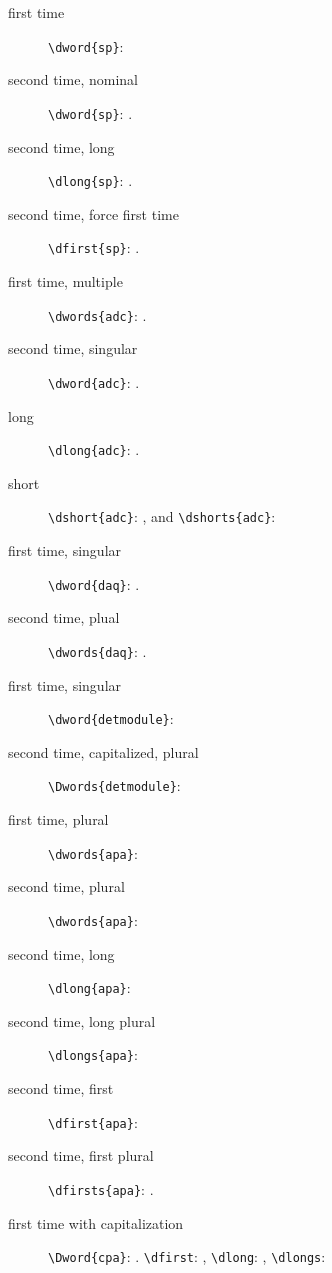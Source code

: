 \documentclass{article}
\begin{document}
\begin{description}

\item[first time] \verb|\dword{sp}|: 

\item[second time, nominal] \verb|\dword{sp}|: .

\item[second time, long] \verb|\dlong{sp}|: .

\item[second time, force first time] \verb|\dfirst{sp}|: .

\item[first time, multiple] \verb|\dwords{adc}|: .

\item[second time, singular] \verb|\dword{adc}|: .

\item[long] \verb|\dlong{adc}|: .

\item[short] \verb|\dshort{adc}|: , and \verb|\dshorts{adc}|: 

\item[first time, singular] \verb|\dword{daq}|: .

\item[second time, plual] \verb|\dwords{daq}|: .

\item[first time, singular] \verb|\dword{detmodule}|: 

\item[second time, capitalized, plural] \verb|\Dwords{detmodule}|: 

\item[first time, plural] \verb|\dwords{apa}|: 

\item[second time, plural] \verb|\dwords{apa}|: 

\item[second time, long] \verb|\dlong{apa}|: 

\item[second time, long plural] \verb|\dlongs{apa}|: 

\item[second time, first] \verb|\dfirst{apa}|: 

\item[second time, first plural] \verb|\dfirsts{apa}|: .

\item[first time with capitalization] \verb|\Dword{cpa}|: . \verb|\dfirst|: , \verb|\dlong|: , \verb|\dlongs|: 

\end{description}
\end{document}
